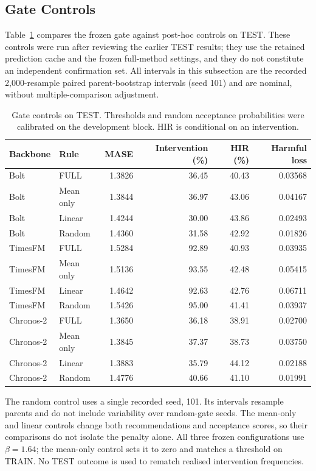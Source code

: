 \documentclass{article}
\begin{document}
\subsection{Gate Controls}
\label{app:gate-controls}
Table~\ref{tab:v52-gates} compares the frozen gate against post-hoc controls on TEST.
These controls were run after reviewing the earlier TEST results; they use the retained
prediction cache and the frozen full-method settings, and they do not constitute an
independent confirmation set. All intervals in this subsection are the recorded
2,000-resample paired parent-bootstrap intervals (seed 101) and are nominal, without
multiple-comparison adjustment.

\begin{table}[htbp]
\centering\small
\caption{Gate controls on TEST. Thresholds and random acceptance probabilities were
calibrated on the development block. HIR is conditional on an intervention.}
\label{tab:v52-gates}
\begin{tabular*}{\textwidth}{@{\extracolsep{\fill}}llrrrr@{}}
\toprule
Backbone & Rule & MASE & Intervention (\%) & HIR (\%) & Harmful loss \\
\midrule
Bolt & FULL & 1.3826 & 36.45 & 40.43 & 0.03568 \\
Bolt & Mean only & 1.3844 & 36.97 & 43.06 & 0.04167 \\
Bolt & Linear & 1.4244 & 30.00 & 43.86 & 0.02493 \\
Bolt & Random & 1.4360 & 31.58 & 42.92 & 0.01826 \\
TimesFM & FULL & 1.5284 & 92.89 & 40.93 & 0.03935 \\
TimesFM & Mean only & 1.5136 & 93.55 & 42.48 & 0.05415 \\
TimesFM & Linear & 1.4642 & 92.63 & 42.76 & 0.06711 \\
TimesFM & Random & 1.5426 & 95.00 & 41.41 & 0.03937 \\
Chronos-2 & FULL & 1.3650 & 36.18 & 38.91 & 0.02700 \\
Chronos-2 & Mean only & 1.3845 & 37.37 & 38.73 & 0.03750 \\
Chronos-2 & Linear & 1.3883 & 35.79 & 44.12 & 0.02188 \\
Chronos-2 & Random & 1.4776 & 40.66 & 41.10 & 0.01991 \\
\bottomrule
\end{tabular*}
\end{table}

The random control uses a single recorded seed, 101. Its intervals resample parents and
do not include variability over random-gate seeds. The mean-only and linear controls change
both recommendations and acceptance scores, so their comparisons do not isolate the penalty
alone. All three frozen configurations use $\beta=1.64$; the mean-only control sets it to
zero and matches a threshold on TRAIN. No TEST outcome is used to rematch realised intervention
frequencies.
\end{document}
